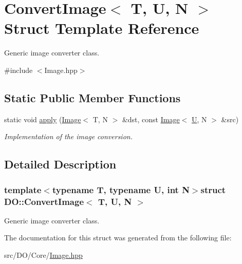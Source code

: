 \hypertarget{struct_d_o_1_1_convert_image}{\section{Convert\-Image$<$ T, U, N $>$ Struct Template Reference}
\label{struct_d_o_1_1_convert_image}
}


Generic image converter class.  




{\ttfamily \#include $<$Image.\-hpp$>$}

\subsection*{Static Public Member Functions}
\begin{DoxyCompactItemize}
\item 
\hypertarget{struct_d_o_1_1_convert_image_afe48b50d9ed6115f19df98129e540c47}{static void \hyperlink{struct_d_o_1_1_convert_image_afe48b50d9ed6115f19df98129e540c47}{apply} (\hyperlink{class_d_o_1_1_image}{Image}$<$ T, N $>$ \&dst, const \hyperlink{class_d_o_1_1_image}{Image}$<$ \hyperlink{struct_d_o_1_1_u}{U}, N $>$ \&src)}\label{struct_d_o_1_1_convert_image_afe48b50d9ed6115f19df98129e540c47}

\begin{DoxyCompactList}\small\item\em Implementation of the image conversion. \end{DoxyCompactList}\end{DoxyCompactItemize}


\subsection{Detailed Description}
\subsubsection*{template$<$typename T, typename U, int N$>$struct D\-O\-::\-Convert\-Image$<$ T, U, N $>$}

Generic image converter class. 

The documentation for this struct was generated from the following file\-:\begin{DoxyCompactItemize}
\item 
src/\-D\-O/\-Core/\hyperlink{_image_8hpp}{Image.\-hpp}\end{DoxyCompactItemize}
